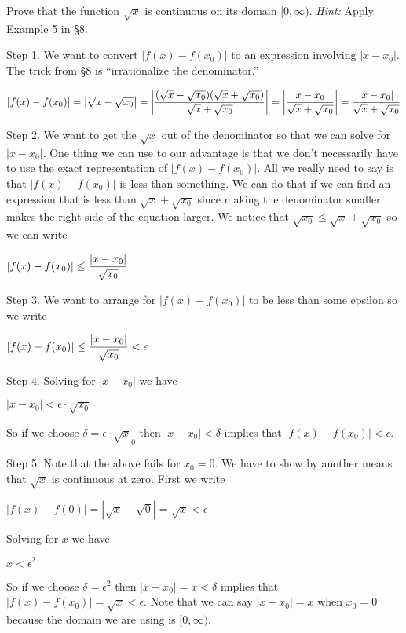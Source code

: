 
Prove that the function $\sqrt x$ is continuous on its domain
$[0,\infty)$. {\it Hint:} Apply Example 5 in \S8.

\medskip

Step 1. We want to convert $|f(x)-f(x_0)|$ to an expression involving $|x-x_0|$.
The trick from \S8 is ``irrationalize the denominator.''

\medskip

$\displaystyle{
|f(x)-f(x_0)|
=\left|\sqrt x-\sqrt{x_0}\right|
=\left|{(\sqrt x-\sqrt{x_0})(\sqrt x+\sqrt{x_0})\over\sqrt x+\sqrt{x_0}}\right|
=\left|{x-x_0\over\sqrt x+\sqrt{x_0}}\right|
={|x-x_0|\over\sqrt x+\sqrt{x_0}}
}$

\medskip

Step 2. We want to get the $\sqrt x$ out of the denominator so that we can
solve for $|x-x_0|$.
One thing we can use to our advantage is that we don't necessarily have to use
the exact representation of $|f(x)-f(x_0)|$.
All we really need to say is that $|f(x)-f(x_0)|$ is less than something.
We can do that if we can find an expression that is less than
$\sqrt x+\sqrt{x_0}$ since making the denominator smaller makes the right
side of the equation larger.
We notice that $\sqrt{x_0}\le\sqrt x+\sqrt{x_0}$ so we can write

\medskip

$\displaystyle{
|f(x)-f(x_0)|
\le{|x-x_0|\over\sqrt{x_0}}
}$

\medskip

Step 3. We want to arrange for $|f(x)-f(x_0)|$ to be less than some epsilon
so we write

\medskip

$\displaystyle{
|f(x)-f(x_0)|
\le{|x-x_0|\over\sqrt{x_0}}<\epsilon
}$


\medskip

Step 4. Solving for $|x-x_0|$ we have

\medskip

$\displaystyle{
|x-x_0|<\epsilon\cdot\sqrt{x_0}
}$

\medskip

So if we choose $\delta=\epsilon\cdot\sqrt x_0$ then $|x-x_0|<\delta$ implies
that $|f(x)-f(x_0)|<\epsilon$.

\medskip

Step 5. Note that the above fails for $x_0=0$.
We have to show by another means that $\sqrt x$ is continuous at zero.
First we write

\medskip

$\displaystyle{
|f(x)-f(0)|
=\left|\sqrt x-\sqrt{0}\right|
=\sqrt x<\epsilon
}$

\medskip

Solving for $x$ we have

\medskip

$\displaystyle{
x<\epsilon^2
}$

\medskip

So if we choose $\delta=\epsilon^2$ then
$|x-x_0|=x<\delta$ implies that $|f(x)-f(x_0)|=\sqrt x<\epsilon$.
Note that we can say $|x-x_0|=x$ when $x_0=0$ because the domain we are using
is $[0,\infty)$.

